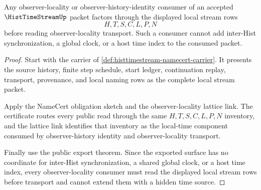 \begin{theorem}
\label{thm:histtimestream-observer-locality-consumption-bridge}
Any observer-locality or observer-history-identity consumer of an accepted $\HistTimeStreamUp$ packet factors through the displayed local stream rows
$$
H,T,S,C,L,P,N
$$
before reading observer-locality transport. Such a consumer cannot add inter-Hist synchronization, a global clock, or a host time index to the consumed packet.
\end{theorem}
\begin{proof}
Start with the carrier of \autoref{def:histtimestream-namecert-carrier}. It presents the source history, finite step schedule, start ledger, continuation replay, transport, provenance, and local naming rows as the complete local stream packet.

Apply the NameCert obligation sketch and the observer-locality lattice link. The certificate routes every public read through the same $H,T,S,C,L,P,N$ inventory, and the lattice link identifies that inventory as the local-time component consumed by observer-history identity and observer-locality transport.

Finally use the public export theorem. Since the exported surface has no coordinate for inter-Hist synchronization, a shared global clock, or a host time index, every observer-locality consumer must read the displayed local stream rows before transport and cannot extend them with a hidden time source.
\end{proof}

